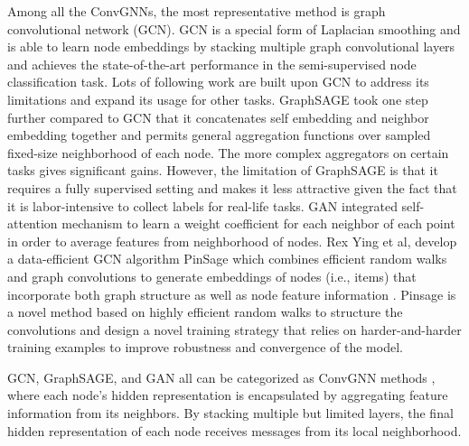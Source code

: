 Among all the ConvGNNs, the most representative method is graph convolutional network (GCN). GCN is a special form of Laplacian smoothing \cite{li2018deeper} and is able to learn node embeddings by stacking multiple graph convolutional layers and achieves the state-of-the-art performance in the semi-supervised node classification task. Lots of following work are built upon GCN to address its limitations and expand its usage for other tasks. GraphSAGE \cite{hamilton2017inductive} took one step further compared to GCN that it concatenates self embedding and neighbor embedding together and permits general aggregation functions over sampled fixed-size neighborhood of each node. The more complex aggregators on certain tasks gives significant gains. However, the limitation of GraphSAGE is that it requires a fully supervised setting and makes it less attractive given the fact that it is labor-intensive to collect labels for real-life tasks. GAN \cite{velivckovic2017graph} integrated self-attention mechanism to learn a weight coefficient for each neighbor of each point in order to average features from neighborhood of nodes. Rex Ying et al, develop a data-efficient GCN algorithm PinSage which combines efficient random walks and graph convolutions to generate embeddings of nodes (i.e., items) that incorporate both graph structure as well as node feature information \cite{pintest}. Pinsage is a novel method based on highly efficient random walks to structure the convolutions and design a novel training strategy that relies on harder-and-harder training examples to improve robustness and convergence of the model.  

GCN, GraphSAGE, and GAN all can be categorized as ConvGNN methods \cite{wu2019comprehensive}, where each node’s hidden representation is encapsulated by aggregating
feature information from its neighbors. By stacking multiple but limited layers, the final hidden representation of each node receives messages from its local neighborhood. 

